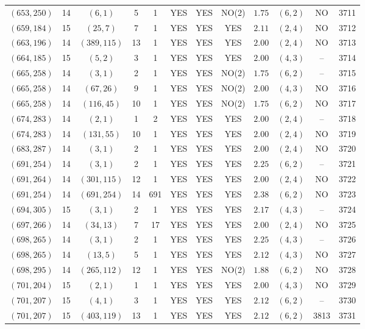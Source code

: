 \begin{longtable}{|c|c|c|c|c|c|c|c|c|c|c|c|}
$(653,250)$ & 14 & $(6,1)$ & 5 & 1 & YES & YES & NO(2) & $1.75$ & $(6,2)$ & NO & 3711\\
$(659,184)$ & 15 & $(25,7)$ & 7 & 1 & YES & YES & YES & $2.11$ & $(2,4)$ & NO & 3712\\
$(663,196)$ & 14 & $(389,115)$ & 13 & 1 & YES & YES & YES & $2.00$ & $(2,4)$ & NO & 3713\\
$(664,185)$ & 15 & $(5,2)$ & 3 & 1 & YES & YES & YES & $2.00$ & $(4,3)$ & -- & 3714\\
$(665,258)$ & 14 & $(3,1)$ & 2 & 1 & YES & YES & NO(2) & $1.75$ & $(6,2)$ & -- & 3715\\
$(665,258)$ & 14 & $(67,26)$ & 9 & 1 & YES & YES & NO(2) & $2.00$ & $(4,3)$ & NO & 3716\\
$(665,258)$ & 14 & $(116,45)$ & 10 & 1 & YES & YES & NO(2) & $1.75$ & $(6,2)$ & NO & 3717\\
$(674,283)$ & 14 & $(2,1)$ & 1 & 2 & YES & YES & YES & $2.00$ & $(2,4)$ & -- & 3718\\
$(674,283)$ & 14 & $(131,55)$ & 10 & 1 & YES & YES & YES & $2.00$ & $(2,4)$ & NO & 3719\\
$(683,287)$ & 14 & $(3,1)$ & 2 & 1 & YES & YES & YES & $2.00$ & $(2,4)$ & NO & 3720\\
$(691,254)$ & 14 & $(3,1)$ & 2 & 1 & YES & YES & YES & $2.25$ & $(6,2)$ & -- & 3721\\
$(691,264)$ & 14 & $(301,115)$ & 12 & 1 & YES & YES & YES & $2.00$ & $(2,4)$ & NO & 3722\\
$(691,254)$ & 14 & $(691,254)$ & 14 & 691 & YES & YES & YES & $2.38$ & $(6,2)$ & NO & 3723\\
$(694,305)$ & 15 & $(3,1)$ & 2 & 1 & YES & YES & YES & $2.17$ & $(4,3)$ & -- & 3724\\
$(697,266)$ & 14 & $(34,13)$ & 7 & 17 & YES & YES & YES & $2.00$ & $(2,4)$ & NO & 3725\\
$(698,265)$ & 14 & $(3,1)$ & 2 & 1 & YES & YES & YES & $2.25$ & $(4,3)$ & -- & 3726\\
$(698,265)$ & 14 & $(13,5)$ & 5 & 1 & YES & YES & YES & $2.12$ & $(4,3)$ & NO & 3727\\
$(698,295)$ & 14 & $(265,112)$ & 12 & 1 & YES & YES & NO(2) & $1.88$ & $(6,2)$ & NO & 3728\\
$(701,204)$ & 15 & $(2,1)$ & 1 & 1 & YES & YES & YES & $2.00$ & $(4,3)$ & NO & 3729\\
$(701,207)$ & 15 & $(4,1)$ & 3 & 1 & YES & YES & YES & $2.12$ & $(6,2)$ & -- & 3730\\
$(701,207)$ & 15 & $(403,119)$ & 13 & 1 & YES & YES & YES & $2.12$ & $(6,2)$ & 3813 & 3731\\

\end{longtable}
